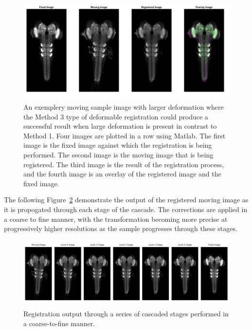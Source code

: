 \documentclass{report}
\begin{document}
	\begin{figure}[h!]
		\centering
		\includegraphics[width=0.9\columnwidth]{resources/chapter4/method3/compare/np_60H12_14E09_MB049B_020113B_scaled.tif.png}
		\caption{An exemplery moving sample image with larger deformation where the Method 3 type of deformable registration could produce a successful result when large deformation is present in contrast to Method 1. Four images are plotted in a row using Matlab. The first image is the fixed image against which the registration is being performed. The second image is the moving image that is being registered. The third image is the result of the registration process, and the fourth image is an overlay of the registered image and the fixed image.}
		\label{fig:method3_fail}
	\end{figure}
	
	The following Figure~\ref{fig:method3_cascade} demonstrate the output of the registered moving image as it is propogated through each stage of the cascade. The corrections are applied in a coarse to fine manner, with the transformation becoming more precise at progressively higher resolutions as the sample progresses through these stages.
	
	\begin{figure}[h!]
		\centering
		\includegraphics[width=\columnwidth]{resources/chapter4/method3/np_60H12_14E09_MB049B_020113B_scaled.png}
		\caption{Registration output through a series of cascaded stages performed in a coarse-to-fine manner.}
		\label{fig:method3_cascade}
	\end{figure}
	
\end{document}
